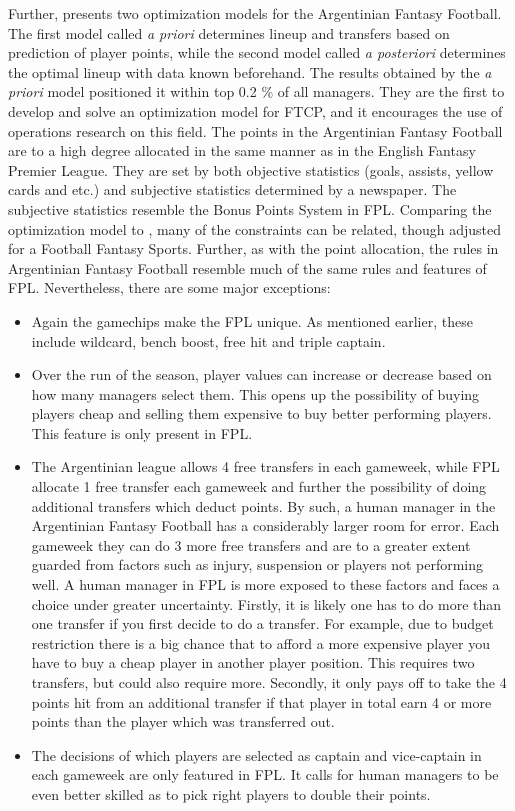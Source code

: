 \newpar

Further, \cite{Bonomo} presents two optimization models for the Argentinian Fantasy Football. The first model called \textit{a priori} determines lineup and transfers based on prediction of player points, while the second model called \textit{a posteriori} determines the optimal lineup with data known beforehand. The results obtained by the \textit{a priori} model positioned it within top 0.2 \% of all managers. They are the first to develop and solve an optimization model for FTCP, and it encourages the use of operations research on this field. The points in the Argentinian Fantasy Football are to a high degree allocated in the same manner as in the English Fantasy Premier League. They are set by both objective statistics (goals, assists, yellow cards and etc.) and subjective statistics determined by a newspaper. The subjective statistics resemble the Bonus Points System in FPL. Comparing the optimization model to \cite{Mathsports}, many of the constraints can be related, though adjusted for a Football Fantasy Sports. Further, as with the point allocation, the rules in Argentinian Fantasy Football resemble much of the same rules and features of FPL. Nevertheless, there are some major exceptions: 


\begin{itemize}
    \item  Again the gamechips make the FPL unique. As mentioned earlier, these include wildcard, bench boost, free hit and triple captain.  
    \item Over the run of the season, player values can increase or decrease based on how many managers select them. This opens up the possibility of buying players cheap and selling them expensive to buy better performing players. This feature is only present in FPL.
    \item The Argentinian league allows 4 free transfers in each gameweek, while FPL allocate 1 free transfer each gameweek and further the possibility of doing additional transfers which deduct points. By such, a human manager in the Argentinian Fantasy Football has a considerably larger room for error. Each gameweek they can do 3 more free transfers and are to a greater extent guarded from factors such as injury, suspension or players not performing well. A human manager in FPL is more exposed to these factors and faces a choice under greater uncertainty. Firstly, it is likely one has to do more than one transfer if you first decide to do a transfer. For example, due to budget restriction there is a big chance that to afford a more expensive player you have to buy a cheap player in another player position. This requires two transfers, but could also require more. Secondly, it only pays off to take the 4 points hit from an additional transfer if that player in total earn 4 or more points than the player which was transferred out. 
    \item The decisions of which players are selected as captain and vice-captain in each gameweek are only featured in FPL. It calls for human managers to be even better skilled as to pick right players to double their points. 
\end{itemize}

